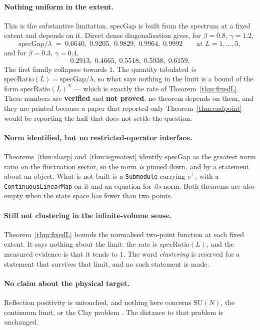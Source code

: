 \documentclass[11pt]{article}
\theoremstyle{definition}
\newcommand{\SU}{\mathrm{SU}}
\begin{document}
\paragraph{Nothing uniform in the extent.}  This is the substantive limitation.
$\mathrm{specGap}$ is built from the spectrum at a fixed extent and depends on
it.  Direct dense diagonalisation gives, for $\beta=0.8$, $\gamma=1.2$,
\[
  \mathrm{specGap}/\lambda \;=\; 0.6640,\;0.9205,\;0.9829,\;0.9964,\;0.9992
  \qquad\text{at } L=1,\dots,5,
\]
and for $\beta=0.3$, $\gamma=0.4$,
\[
  0.2913,\;0.4665,\;0.5518,\;0.5938,\;0.6159 .
\]
The first family collapses towards $1$.  The quantity tabulated \emph{is}
$\mathrm{specRatio}(L)=\mathrm{specGap}/\lambda$, so what says nothing in the
limit is a bound of the form $\mathrm{specRatio}(L)^{N}$ --- which is exactly
the rate of Theorem~\ref{thm:fixedL}.  These numbers are
\textbf{verified} and \textbf{not proved}, no theorem depends on them, and they
are printed because a paper that reported only Theorem~\ref{thm:endpoint} would
be reporting the half that does not settle the question.

\paragraph{Norm identified, but no restricted-operator interface.}
Theorems~\ref{thm:sharp} and~\ref{thm:isgreatest} identify $\mathrm{specGap}$ as
the greatest norm ratio on the fluctuation sector, so the norm \emph{is} pinned
down, and by a statement about an object.  What is not built is a
\texttt{Submodule} carrying $v^{\perp}$, with a \texttt{ContinuousLinearMap} on
it and an equation for \emph{its} norm.  Both theorems are also empty when the
state space has fewer than two points.

\paragraph{Still not clustering in the infinite-volume sense.}
Theorem~\ref{thm:fixedL} bounds the normalised two-point function at each fixed
extent.  It says nothing about the limit: the rate is
$\mathrm{specRatio}(L)$, and the measured evidence is that it tends to $1$.
The word \emph{clustering} is reserved for a statement that survives that limit,
and no such statement is made.

\paragraph{No claim about the physical target.}  Reflection positivity is
untouched, and nothing here concerns $\SU(N)$, the continuum limit, or the Clay
problem \cite{Clay}.  The distance to that problem is unchanged.
\end{document}
